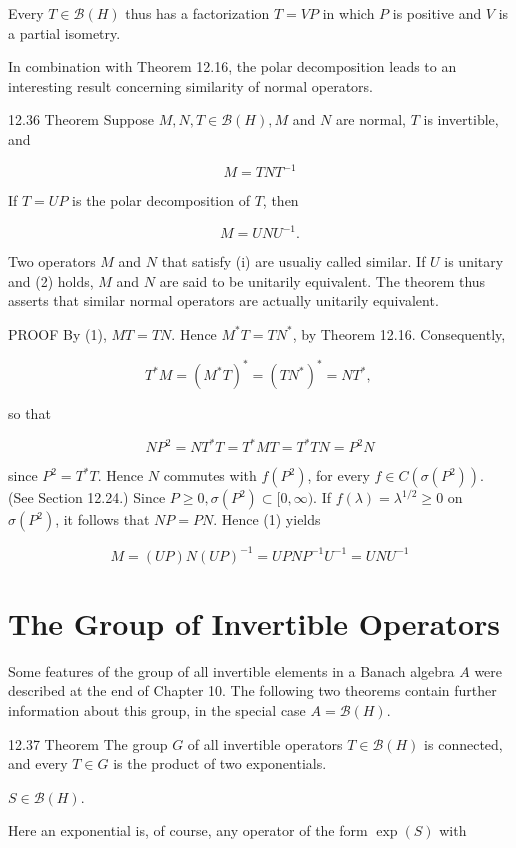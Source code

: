 \documentclass[10pt]{article}
\begin{document}
Every $T \in \mathscr{B}(H)$ thus has a factorization $T=V P$ in which $P$ is positive and $V$ is a partial isometry.

In combination with Theorem 12.16, the polar decomposition leads to an interesting result concerning similarity of normal operators.

12.36 Theorem Suppose $M, N, T \in \mathscr{B}(H), M$ and $N$ are normal, $T$ is invertible, and

$$
M=T N T^{-1}
$$

If $T=U P$ is the polar decomposition of $T$, then

$$
M=U N U^{-1} .
$$

Two operators $M$ and $N$ that satisfy (i) are usualiy called similar. If $U$ is unitary and (2) holds, $M$ and $N$ are said to be unitarily equivalent. The theorem thus asserts that similar normal operators are actually unitarily equivalent.

PROOF By (1), $M T=T N$. Hence $M^{*} T=T N^{*}$, by Theorem 12.16. Consequently,

$$
T^{*} M=\left(M^{*} T\right)^{*}=\left(T N^{*}\right)^{*}=N T^{*} \text {, }
$$

so that

$$
N P^{2}=N T^{*} T=T^{*} M T=T^{*} T N=P^{2} N
$$

since $P^{2}=T^{*} T$. Hence $N$ commutes with $f\left(P^{2}\right)$, for every $f \in C\left(\sigma\left(P^{2}\right)\right)$. (See Section 12.24.) Since $P \geq 0, \sigma\left(P^{2}\right) \subset[0, \infty)$. If $f(\lambda)=\lambda^{1 / 2} \geq 0$ on $\sigma\left(P^{2}\right)$, it follows that $N P=P N$. Hence (1) yields

$$
M=(U P) N(U P)^{-1}=U P N P^{-1} U^{-1}=U N U^{-1}
$$

\section{The Group of Invertible Operators}
Some features of the group of all invertible elements in a Banach algebra $A$ were described at the end of Chapter 10. The following two theorems contain further information about this group, in the special case $A=\mathscr{B}(H)$.

12.37 Theorem The group $G$ of all invertible operators $T \in \mathscr{B}(H)$ is connected, and every $T \in G$ is the product of two exponentials.

$S \in \mathscr{B}(H)$.

Here an exponential is, of course, any operator of the form $\exp (S)$ with
\end{document}
